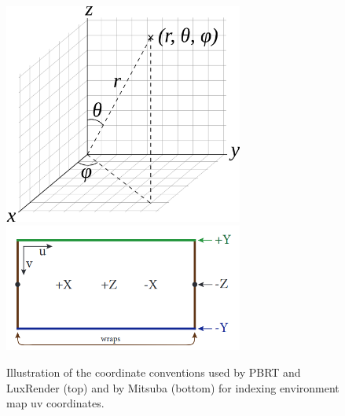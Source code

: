 \begin{figure}[h]
  \centering
  \includegraphics[width=0.7\textwidth,height=\textheight,keepaspectratio]{images/4_system_architecture/spherical_coordinates.png}
  \includegraphics[width=0.7\textwidth,height=\textheight,keepaspectratio]{images/4_system_architecture/mitdocemitter.png}
  \caption{Illustration of the coordinate conventions used by PBRT and LuxRender 
  (top) and by Mitsuba (bottom) for indexing environment map uv coordinates.}
  \label{fig:mitdocemitter}
\end{figure}
